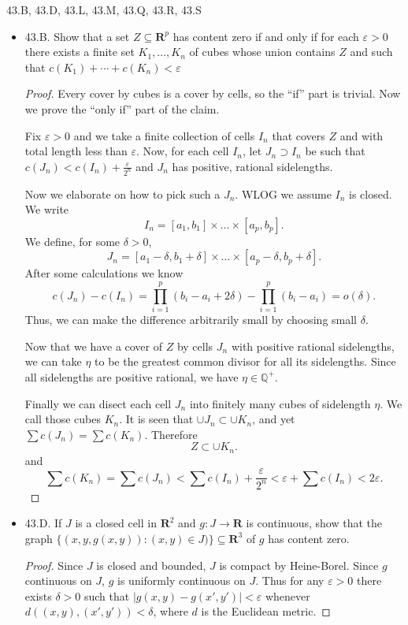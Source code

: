 
43.B, 43.D, 43.L, 43.M, 43.Q, 43.R, 43.S
\begin{itemize}
	\newpage
	\item 
43.B. Show that a set $Z \subseteq \boldsymbol{R}^p$ has content zero if and only if for each $\varepsilon>0$ there exists a finite set $K_1, \ldots, K_n$ of cubes whose union contains $Z$ and such that $c\left(K_1\right)+\cdots+c\left(K_n\right)<\varepsilon$
\begin{proof}
	Every cover by cubes is a cover by cells, so the ``if'' part is trivial. Now we prove the ``only if'' part of the claim.

		Fix $\varepsilon>0$ and we take a finite collection of cells $I_n$ that covers $Z$ and with total length less than $\varepsilon$. Now, for each cell $I_n$, let $J_n \supset I_n$ be such that $c(J_n) < c(I_n) + \frac{\varepsilon}{2^n}$ and $J_n$ has positive, rational sidelengths.
		
		Now we elaborate on how to pick such a $J_n$. WLOG we assume $I_n$ is closed. We write
		\[
			I_n = [a_1, b_1] \times \ldots\times [a_p, b_p]
		.\] 
		We define, for some $\delta>0$,
		\[
			J_n = [a_1 - \delta, b_1 + \delta] \times \ldots \times [a_p - \delta, b_p + \delta]
		.\] 
		After some calculations we know
		\[
			c(J_n) - c(I_n) = \prod_{i = 1}^{p} (b_i - a_i + 2 \delta) - \prod_{i = 1}^{p} (b_i - a_i) = o(\delta)  
		.\] 
		Thus, we can make the difference arbitrarily small by choosing small $\delta$.

		Now that we have a cover of $Z$ by cells $J_n$ with positive rational sidelengths, we can take $\eta$ to be the greatest common divisor for all its sidelengths. Since all sidelengths are positive rational, we have $\eta \in \mathbb{Q}^{+}$. 

		Finally we can disect each cell $J_n$ into finitely many cubes of sidelength $\eta$. We call those cubes $K_n$. It is seen that $\cup J_n \subset \cup K_n$, and yet $\sum c(J_n)  = \sum c(K_n)$. Therefore
		\[
			Z \subset \cup K_n  
		.\] 
		and
		\[
			\sum c(K_n) = \sum c(J_n) < \sum c(I_n) + \frac{\varepsilon}{2^n} < \varepsilon + \sum c(I_n) < 2 \varepsilon
		.\]
\end{proof}

\newpage
\item 43.D. If $J$ is a closed cell in $\boldsymbol{R}^2$ and $g: J \rightarrow \boldsymbol{R}$ is continuous, show that the graph $\{(x, y, g(x, y)):(x, y) \in J)\} \subseteq \boldsymbol{R}^3$ of $g$ has content zero.
\begin{proof}
	Since $J$ is closed and bounded, $J$ is compact by Heine-Borel. Since $g$ continuous on $J$, $g$ is uniformly continuous on $J$. Thus for any $\varepsilon>0$ there exists $\delta>0$ such that $\left| g(x,y) - g(x', y')  \right| <\varepsilon$ whenever $d\left( (x,y), (x', y') \right) < \delta$, where $d$ is the Euclidean metric. 


\end{proof}
\end{itemize}
